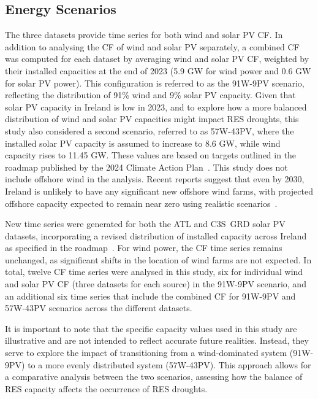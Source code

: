 \documentclass[preprint, 12pt]{elsarticle}
\begin{document}
\subsection{Energy Scenarios}
\label{sec:scenarios}

The three datasets provide time series for both wind and solar PV CF. In addition to analysing the CF of wind and solar PV separately, a combined CF was computed for each dataset by averaging wind and solar PV CF, weighted by their installed capacities at the end of 2023 (5.9 GW for wind power and 0.6 GW for solar PV power). This configuration is referred to as the 91W-9PV scenario, reflecting the distribution of 91\% wind and 9\% solar PV capacity. Given that solar PV capacity in Ireland is low in 2023, and to explore how a more balanced distribution of wind and solar PV capacities might impact RES droughts, this study also considered a second scenario, referred to as 57W-43PV, where the installed solar PV capacity is assumed to increase to 8.6 GW, while wind capacity rises to 11.45 GW. These values are based on targets outlined in the roadmap published by the 2024 Climate Action Plan~\citep{cap2024future}. This study does not include offshore wind in the analysis. Recent reports suggest that even by 2030, Ireland is unlikely to have any significant new offshore wind farms, with projected offshore capacity expected to remain near zero using realistic scenarios~\citep{seai2024future}.

New time series were generated for both the ATL and C3S~GRD solar PV datasets, incorporating a revised distribution of installed capacity across Ireland as specified in the roadmap~\citep{eirgrid2023future}. For wind power, the CF time series remains unchanged, as significant shifts in the location of wind farms are not expected. In total, twelve CF time series were analysed in this study, six for individual wind and solar PV CF (three datasets for each source) in the 91W-9PV scenario, and an additional six time series that include the combined CF for 91W-9PV and 57W-43PV scenarios across the different datasets.

It is important to note that the specific capacity values used in this study are illustrative and are not intended to reflect accurate future realities. Instead, they serve to explore the impact of transitioning from a wind-dominated system (91W-9PV) to a more evenly distributed system (57W-43PV). This approach allows for a comparative analysis between the two scenarios, assessing how the balance of RES capacity affects the occurrence of RES droughts.
\end{document}
